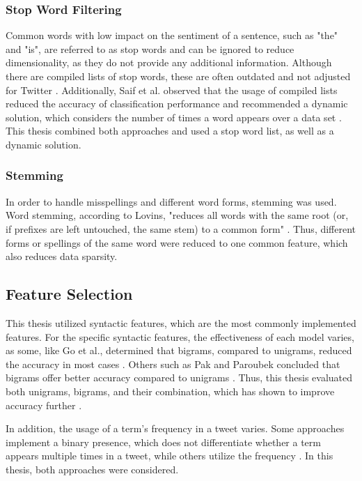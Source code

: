 \subsubsection{Stop Word Filtering}
Common words with low impact on the sentiment of a sentence, such as "the" and "is", are referred to as stop words and can be ignored to reduce dimensionality, as they do not provide any additional information. Although there are compiled lists of stop words, these are often outdated and not adjusted for Twitter \cite{DBLP:journals/csur/GiachanouC16}. Additionally, Saif et al. observed that the usage of compiled lists reduced the accuracy of classification performance and recommended a dynamic solution, which considers the number of times a word appears over a data set \cite{data_sparsity}. This thesis combined both approaches and used a stop word list, as well as a dynamic solution.

\subsubsection{Stemming}
In order to handle misspellings and different word forms, stemming was used. Word stemming, according to Lovins, "reduces all words with the same root (or, if prefixes are left
untouched, the same stem) to a common form" \cite[p.~22]{Lovins1968DevelopmentOA}. Thus, different forms or spellings of the same word were reduced to one common feature, which also reduces data sparsity.

\subsection{Feature Selection}
This thesis utilized syntactic features, which are the most commonly implemented features. For the specific syntactic features, the effectiveness of each model varies, as some, like Go et al., determined that bigrams, compared to unigrams, reduced the accuracy in most cases \cite{GoBHaHua2009}. Others such as Pak and Paroubek concluded that bigrams offer better accuracy compared to unigrams \cite{pak}. Thus, this thesis evaluated both unigrams, bigrams, and their combination, which has shown to improve accuracy further \cite{GoBHaHua2009}.

In addition, the usage of a term's frequency in a tweet varies. Some approaches implement a binary presence, which does not differentiate whether a term appears multiple times in a tweet, while others utilize the frequency \cite{DBLP:journals/csur/GiachanouC16}. In this thesis, both approaches were considered.

